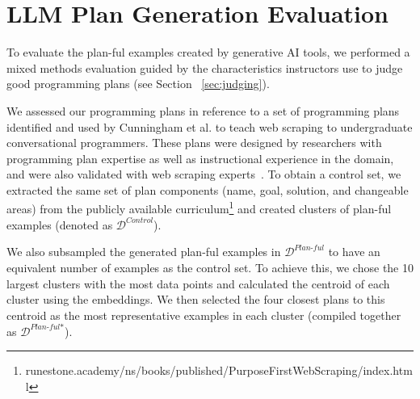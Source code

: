 \section{LLM Plan Generation Evaluation}

To evaluate the plan-ful examples created by generative AI tools, we performed a mixed methods evaluation 
guided by
the characteristics instructors use to judge good programming plans (see Section ~\ref{sec:judging}).


We assessed our programming plans in reference to a set of programming plans identified and used by Cunningham et al. \cite{Cunningham_PurposeFirstProgramming_CHI-2021} to teach web scraping to undergraduate conversational programmers. These plans were designed by researchers with programming plan expertise as well as instructional experience in the domain, and were also validated with web scraping experts~\cite{Cunningham_PurposeFirstProgramming_CHI-2021}. 
To obtain a control set, we extracted the same set of plan components (name, goal, solution, and changeable areas) from the publicly available curriculum\footnote{runestone.academy/ns/books/published/PurposeFirstWebScraping/index.html} and created clusters of plan-ful examples (denoted as \(\mathcal{D}^{\textit{Control}}\)). %

We also subsampled the generated plan-ful examples in \(\mathcal{D}^{\textit{Plan-ful}}\) to have an equivalent number of examples as the control set. To achieve this, we chose the 10 largest clusters with the most data points and calculated the centroid of each cluster using the embeddings. We then selected the four closest plans to this centroid as the most representative examples in each cluster (compiled together as \(\mathcal{D}^{\textit{Plan-ful*}}\)). 


